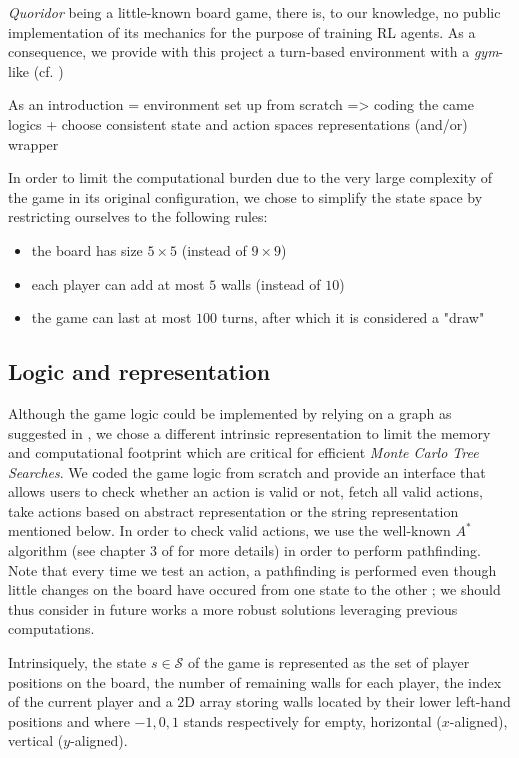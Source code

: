 \documentclass[journal, a4paper]{IEEEtran}
\begin{document}
 \textit{Quoridor} being a little-known board game, there is, to our knowledge, no public implementation of its mechanics for the purpose of training RL agents. As a consequence, we provide with this project a turn-based environment with a \textit{gym}-like (cf. \cite{openai-gym})

As an introduction = environment set up from scratch => coding the came logics + choose consistent state and action spaces representations (and/or) wrapper

In order to limit the computational burden due to the very large complexity of the game in its original configuration, we chose to simplify the state space by restricting ourselves to the following rules:
\begin{itemize}
    \item the board has size $5\times 5$ (instead of $9\times 9$)
    \item each player can add at most $5$ walls (instead of $10$)
    \item the game can last at most $100$ turns, after which it is considered a "draw"
\end{itemize}

\subsection{Logic and representation}
Although the game logic could be implemented by relying on a graph as suggested in \cite{heuristic-agent}, we chose a different intrinsic representation to limit the memory and computational footprint which are critical for efficient \textit{Monte Carlo Tree Searches}. We coded the game logic from scratch and provide an interface that allows users to check whether an action is valid or not, fetch all valid actions, take actions based on abstract representation or the string representation mentioned below. In order to check valid actions, we use the well-known $A^*$ algorithm (see chapter 3 of \cite{russel2010} for more details) in order to perform pathfinding. Note that every time we test an action, a pathfinding is performed even though little changes on the board have occured from one state to the other ; we should thus consider in future works a more robust solutions leveraging previous computations.

Intrinsiquely, the state $s\in\mathcal{S}$ of the game is represented as the set of player positions on the board, the number of remaining walls for each player, the index of the current player and a 2D array storing walls located by their lower left-hand positions and where $-1, 0, 1$ stands respectively for empty, horizontal ($x$-aligned), vertical ($y$-aligned).
\end{document}
